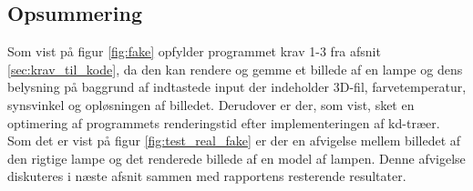 \subsection*{Opsummering}
Som vist på figur \ref{fig:fake} opfylder programmet krav 1-3 fra afsnit \ref{sec:krav_til_kode}, da den kan rendere og gemme et billede af en lampe og dens belysning på baggrund af indtastede input der indeholder 3D-fil, farvetemperatur, synsvinkel og opløsningen af billedet. Derudover er der, som vist, sket en optimering af programmets renderingstid efter implementeringen af kd-træer. 
Som det er vist på figur \ref{fig:test_real_fake} er der en afvigelse mellem billedet af den rigtige lampe og det renderede billede af en model af lampen. Denne afvigelse diskuteres i næste afsnit sammen med rapportens resterende resultater. 

